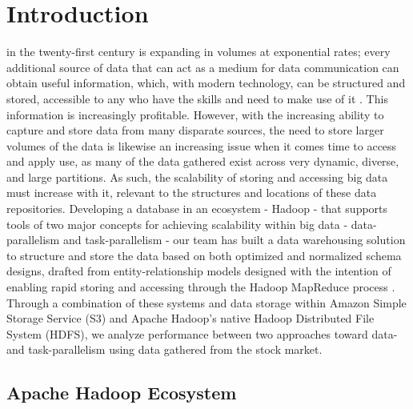 \documentclass[journal]{IEEEtran}
\begin{document}
%
\IEEEpeerreviewmaketitle



\section{Introduction}

 in the twenty-first century is expanding in volumes
 at exponential rates; every additional source of data that can act as a
 medium for data communication can obtain useful information, which,
 with modern technology, can be structured and stored, accessible to any
 who have the skills and need to make use of it \cite{BigDataComputing}. 
This information is increasingly profitable. 
However, with the increasing ability to capture and store data from many
 disparate sources, the need to store larger volumes of the data is
 likewise an increasing issue when it comes time to access and apply use,
 as many of the data gathered exist across very dynamic, diverse, and
 large partitions. 
As such, the scalability of storing and accessing big data must increase
 with it, relevant to the structures and locations of these data repositories. 
Developing a database in an ecosystem - Hadoop - that supports tools of
 two major concepts for achieving scalability within big data -
 data-parallelism and task-parallelism - our team has built a data
 warehousing solution to structure and store the data based on both
 optimized and normalized schema designs, drafted from entity-relationship
 models designed with the intention of enabling rapid storing and accessing
 through the Hadoop MapReduce process \cite{BigDataComputing}. 
Through a combination of these systems and data storage within
 Amazon Simple Storage Service (S3) and Apache Hadoop's native Hadoop
 Distributed File System (HDFS), we analyze performance between two
 approaches toward data- and task-parallelism using data gathered from
 the stock market.

\subsection{Apache Hadoop Ecosystem}
\end{document}
